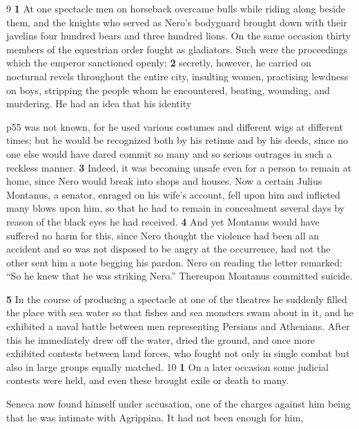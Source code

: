 9
\textbf{1} At one spectacle men on horseback overcame bulls while riding along beside them, and the knights who served as Nero's bodyguard brought down with their javelins four hundred bears and three hundred lions. On the same occasion thirty members of the equestrian order fought as gladiators. Such were the proceedings which the emperor sanctioned openly; \textbf{2} secretly, however, he carried on nocturnal revels throughout the entire city, insulting women, practising lewdness on boys, stripping the people whom he encountered, beating, wounding, and murdering. He had an idea that his identity

p55 was not known, for he used various costumes and different wigs at different times; but he would be recognized both by his retinue and by his deeds, since no one else would have dared commit so many and so serious outrages in such a reckless manner. \textbf{3} Indeed, it was becoming unsafe even for a person to remain at home, since Nero would break into shops and houses. Now a certain Julius Montanus, a senator, enraged on his wife's account, fell upon him and inflicted many blows upon him, so that he had to remain in concealment several days by reason of the black eyes he had received. \textbf{4} And yet Montanus would have suffered no harm for this, since Nero thought the violence had been all an accident and so was not disposed to be angry at the occurrence, had not the other sent him a note begging his pardon. Nero on reading the letter remarked: ``So he knew that he was striking Nero.'' Thereupon Montanus committed suicide.

\textbf{5} In the course of produ­cing a spectacle at one of the theatres he suddenly filled the place with sea water so that fishes and sea monsters swam about in it, and he exhibited a naval battle between men representing Persians and Athenians. After this he immediately drew off the water, dried the ground, and once more exhibited contests between land forces, who fought not only in single combat but also in large groups equally matched.
10
\textbf{1} On a later occasion some judicial contests were held, and even these brought exile or death to many.

Seneca now found himself under accusation, one of the charges against him being that he was intimate with Agrippina. It had not been enough for him,

